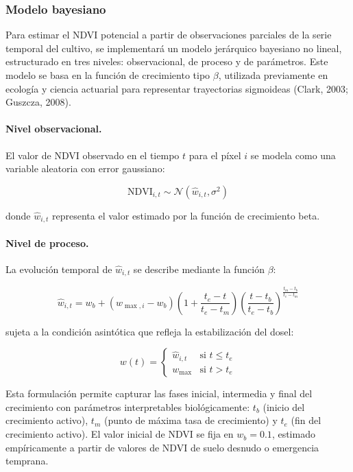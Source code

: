 \documentclass[
11pt, %
]{charter}
\begin{document}
\subsubsection{Modelo bayesiano}
\label{sec:modelo_bayesiano}

Para estimar el NDVI potencial a partir de observaciones parciales de la serie temporal del cultivo, se implementará un modelo jerárquico bayesiano no lineal, estructurado en tres niveles: observacional, de proceso y de parámetros. Este modelo se basa en la función de crecimiento tipo $\beta$, utilizada previamente en ecología y ciencia actuarial para representar trayectorias sigmoideas (Clark, 2003; Guszcza, 2008).

\paragraph{Nivel observacional.} El valor de NDVI observado en el tiempo \( t \) para el píxel \( i \) se modela como una variable aleatoria con error gaussiano:

\begin{equation}
\text{NDVI}_{i,t} \sim \mathcal{N}(\hat{w}_{i,t}, \sigma^2)
\end{equation}

donde \( \hat{w}_{i,t} \) representa el valor estimado por la función de crecimiento beta.

\paragraph{Nivel de proceso.} La evolución temporal de \( \hat{w}_{i,t} \) se describe mediante la función $\beta$:

\begin{equation}
\hat{w}_{i,t} = w_b + (w_{\max,i} - w_b) 
\left( 1 + \frac{t_e - t}{t_e - t_m} \right)
\left( \frac{t - t_b}{t_e - t_b} \right)^{\frac{t_m - t_b}{t_e - t_m}}
\end{equation}

\noindent
sujeta a la condición asintótica que refleja la estabilización del dosel:

\begin{equation}
w(t) =
\begin{cases}
\hat{w}_{i,t} & \text{si } t \leq t_e \\
w_{\max} & \text{si } t > t_e
\end{cases}
\end{equation}

Esta formulación permite capturar las fases inicial, intermedia y final del crecimiento con parámetros interpretables biológicamente: $t_b$ (inicio del crecimiento activo), $t_m$ (punto de máxima tasa de crecimiento) y $t_e$ (fin del crecimiento activo). El valor inicial de NDVI se fija en $w_b = 0.1$, estimado empíricamente a partir de valores de NDVI de suelo desnudo o emergencia temprana.
\end{document}

